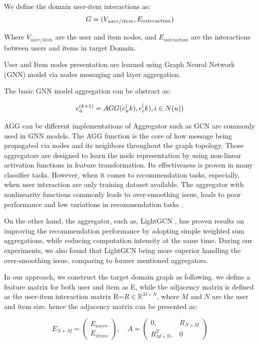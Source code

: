 We define the domain user-item interactions as:
\begin{equation}
\centering
G = (V_{user/item}, E_{interaction})
\end{equation}

Where $V_{user/item}$ are the user and item nodes, and $E_{interaction}$ are the interactions between users and items in target Domain.

User and Item nodes presentation are learned using Graph Neural Network (GNN) model via nodes messaging and layer aggregation.

The basic GNN model aggregation can be abstract as:

\begin{equation}
\centering
e_u^{(k+1)} = AGG(e_u^(k),{e_i^(k), i \in N(u)})
\end{equation}

AGG can be different implementations of Aggregator such as GCN \cite{kipf2016semi, veličković2018graphattentionnetworks, hamilton2017inductive} are commonly used in GNN models.
The AGG function is the core of how message being propagated via nodes and its neighbors throughout the graph topology.
Those aggregators are designed to learn the node representation by using non-linear activation functions in feature transformation. Its effectiveness is proven in many classifier tasks.
However, when it comes to recommendation tasks, especially, when user interaction are only training dataset available.
The aggregator with nonlinearity functions commonly leads to over-smoothing issue, leads to poor performance and low variations in recommendation tasks \cite{Sharma2023ExperimentalHA}.

On the other hand, the aggregator, such as, LightGCN \cite{he2020lightgcn}, has proven results on improving the recommendation performance by adopting simple weighted sum aggregations, while reducing computation intensity at the same time.
During our experiments, we also found that LightGCN being more superior handling the over-smoothing issue, comparing to former mentioned aggregators.


In our approach, we construct the target domain graph as following.
we define a feature matrix for both user and item as E, while the adjacency matrix is defined as the user-item interaction matrix R=$R \in \mathbb{R}^{M \times N}$, where $M$ and $N$ are the user and item size.
hence the adjacency matrix can be presented as:

\begin{equation}
    E_{N+M} = \begin{pmatrix}
    E_{users} \\
    E_{items}
    \end{pmatrix},
    \quad
    A = \begin{pmatrix}
        0, & R_{N \times M} \\
        R^T_{M \times N}, & 0
        \end{pmatrix}
\end{equation}




